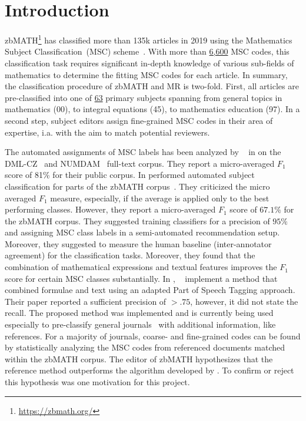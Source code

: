 \section{Introduction}\label{sec:intro}
zbMATH\footnote{\href{https://zbmath.org/}{{https://zbmath.org/}}} has classified more than 135k articles in 2019 using the Mathematics Subject Classification~(MSC) scheme~\cite{Khnemund2016}.
With more than \href{https://zbmath.org/classification/}{{6,600}} MSC codes, this classification task requires significant in-depth knowledge of various sub-fields of mathematics to determine the fitting MSC codes for each article.
In summary, the classification procedure of zbMATH and MR is two-fold.
First, all articles are pre-classified into one of  \href{https://msc2020.org}{{63}}  primary subjects spanning from general topics in mathematics (00), to integral equations (45), to mathematics education (97).
In a second step, subject editors assign fine-grained MSC codes in their area of expertise, i.a. with the aim to match potential reviewers.




The automated assignments of MSC labels has been analyzed by \citeauthor{RehurekS08}~\cite{RehurekS08} in \citeyear{RehurekS08} on the DML-CZ~\cite{SojkaR07} and NUMDAM~\cite{BoucheL17} full-text corpus.
They report a micro-averaged $F_1$ score of 81\% for their public corpus.
In \citeyear{BarthelTB13} \citeauthor{BarthelTB13} performed automated subject classification for parts of the zbMATH corpus~\cite{BarthelTB13}.
They criticized the micro averaged $F_1$ measure, especially, if the average is applied only to the best performing classes. However, they report a micro-averaged $F_1$ score of $67.1\%$ for the zbMATH corpus.
They suggested training classifiers for a precision of $95\%$ and assigning MSC class labels in a  semi-automated recommendation setup.
Moreover, they suggested to measure the human baseline (inter-annotator agreement) for the classification tasks.
Moreover, they found that the combination of mathematical expressions and textual features improves the $F_1$ score for certain MSC classes substantially.
In \citeyear{SchonebergS14}, \citeauthor{SchonebergS14}~\cite{SchonebergS14} implement a method that combined formulae and text using an adapted Part of Speech Tagging approach.
Their paper reported a sufficient precision of $>.75$, however, it did not state the recall.
The proposed method was implemented and is currently being used especially to pre-classify general journals~\cite{zbMATH06353861} with additional information, like references.
For a majority of journals, coarse- and fine-grained codes can be found by statistically analyzing the MSC codes from referenced documents matched within the zbMATH corpus.
The editor of zbMATH hypothesizes that the reference method outperforms the algorithm developed by \citeauthor{SchonebergS14}.
To confirm or reject this hypothesis was one motivation for this project.

